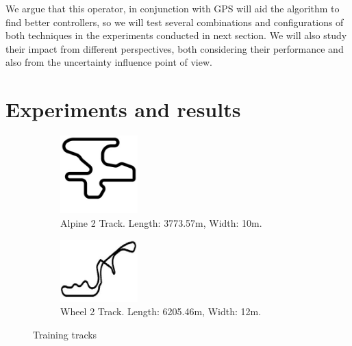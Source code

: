 \documentclass[10pt,journal,compsoc]{IEEEtran}
\begin{document}
We argue that this operator, in conjunction with GPS will aid the
algorithm to find better controllers, so we will test several
combinations and configurations of both techniques in the experiments
conducted in next section. We will also study their impact from
different perspectives, both considering their performance and also
from the uncertainty influence point of view. 



\section{Experiments and results}  
\label{sec:results}

%
\begin{figure}[!ht]	
\centering
\begin{subfigure}[b]{0.15\textwidth}
	\centering
	\includegraphics[width=3cm]{fig/alpine2.jpg}
	\caption{Alpine 2 Track.  Length: 3773.57m, Width: 10m.}
	\label{fig:y equals x}
\end{subfigure}
\hfill
\begin{subfigure}[b]{0.15\textwidth}
	\centering
	\includegraphics[width=3cm]{fig/wheel2.jpg}
	\caption{Wheel 2 Track.  Length: 6205.46m, Width: 12m.}
	\label{fig:three sin x}
\end{subfigure}
\caption{Training tracks}
\label{fig:three graphs}
\end{figure}
\end{document}

